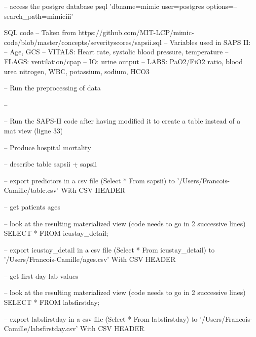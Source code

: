-- access the postgre database
psql 'dbname=mimic user=postgres options=--search_path=mimiciii'


SQL code
-- Taken from https://github.com/MIT-LCP/mimic-code/blob/master/concepts/severityscores/sapsii.sql
-- Variables used in SAPS II:
--  Age, GCS
--  VITALS: Heart rate, systolic blood pressure, temperature
--  FLAGS: ventilation/cpap
--  IO: urine output
--  LABS: PaO2/FiO2 ratio, blood urea nitrogen, WBC, potassium, sodium, HCO3

-- Run the preprocessing of data

-- 







-- Run the SAPS-II code after having modified it to create a table instead of a mat view (ligne 33)


-- Produce hospital mortality


-- describe table sapsii
\d+ sapsii

-- export predictors in a csv file
\copy (Select * From sapsii) to '/Users/Francois-Camille/table.csv' With CSV HEADER

-- get patients ages


-- look at the resulting materialized view (code needs to go in 2 successive lines)
SELECT *
FROM icustay_detail;

-- export icustay_detail in a csv file
\copy (Select * From icustay_detail) to '/Users/Francois-Camille/ages.csv' With CSV HEADER

-- get first day lab values


-- look at the resulting materialized view (code needs to go in 2 successive lines)
SELECT *
FROM labsfirstday;

-- export labsfirstday in a csv file
\copy (Select * From labsfirstday) to '/Users/Francois-Camille/labsfirstday.csv' With CSV HEADER
